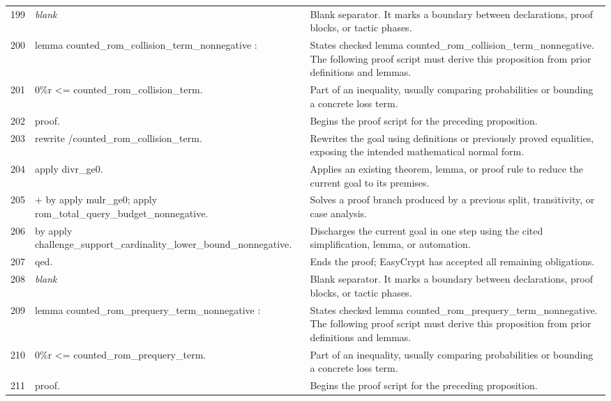 \documentclass[10pt]{article}
\begin{document}
\begin{longtable}{r L{0.53\textwidth} L{0.37\textwidth}}
199 & {\ttfamily\scriptsize \emph{blank}} & Blank separator.  It marks a boundary between declarations, proof blocks, or tactic phases. \\
200 & {\ttfamily\scriptsize lemma counted\_rom\_collision\_term\_nonnegative :} & States checked lemma counted\_rom\_collision\_term\_nonnegative.  The following proof script must derive this proposition from prior definitions and lemmas. \\
201 & {\ttfamily\scriptsize   0\%r <= counted\_rom\_collision\_term.} & Part of an inequality, usually comparing probabilities or bounding a concrete loss term. \\
202 & {\ttfamily\scriptsize proof.} & Begins the proof script for the preceding proposition. \\
203 & {\ttfamily\scriptsize rewrite /counted\_rom\_collision\_term.} & Rewrites the goal using definitions or previously proved equalities, exposing the intended mathematical normal form. \\
204 & {\ttfamily\scriptsize apply divr\_ge0.} & Applies an existing theorem, lemma, or proof rule to reduce the current goal to its premises. \\
205 & {\ttfamily\scriptsize + by apply mulr\_ge0; apply rom\_total\_query\_budget\_nonnegative.} & Solves a proof branch produced by a previous split, transitivity, or case analysis. \\
206 & {\ttfamily\scriptsize by apply challenge\_support\_cardinality\_lower\_bound\_nonnegative.} & Discharges the current goal in one step using the cited simplification, lemma, or automation. \\
207 & {\ttfamily\scriptsize qed.} & Ends the proof; EasyCrypt has accepted all remaining obligations. \\
208 & {\ttfamily\scriptsize \emph{blank}} & Blank separator.  It marks a boundary between declarations, proof blocks, or tactic phases. \\
209 & {\ttfamily\scriptsize lemma counted\_rom\_prequery\_term\_nonnegative :} & States checked lemma counted\_rom\_prequery\_term\_nonnegative.  The following proof script must derive this proposition from prior definitions and lemmas. \\
210 & {\ttfamily\scriptsize   0\%r <= counted\_rom\_prequery\_term.} & Part of an inequality, usually comparing probabilities or bounding a concrete loss term. \\
211 & {\ttfamily\scriptsize proof.} & Begins the proof script for the preceding proposition. \\

\end{longtable}
\end{document}
